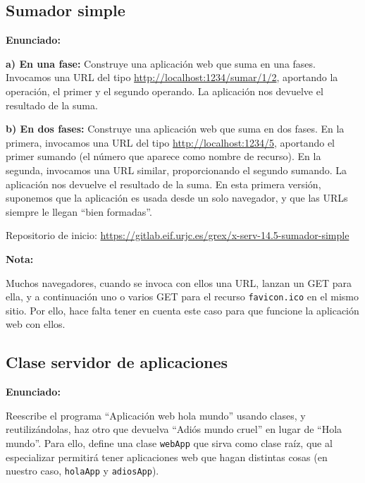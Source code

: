 \subsection{Sumador simple}
\label{subsec:sumador-simple}

\textbf{Enunciado:}

{\bf a) En una fase:} Construye una aplicación web que suma en una fases. Invocamos una URL del tipo \url{http://localhost:1234/sumar/1/2}, aportando la operación, el primer y el segundo operando. La aplicación nos devuelve el resultado de la suma.

{\bf b) En dos fases: } Construye una aplicación web que suma en dos fases. En la primera, invocamos una URL del tipo \url{http://localhost:1234/5}, aportando el primer sumando (el número que aparece como nombre de recurso). En la segunda, invocamos una URL similar, proporcionando el segundo sumando. La aplicación nos devuelve el resultado de la suma. En esta primera versión, suponemos que la aplicación es usada desde un solo navegador, y que las URLs siempre le llegan ``bien formadas''.

Repositorio de inicio: \url{https://gitlab.eif.urjc.es/grex/x-serv-14.5-sumador-simple}

\textbf{Nota:}

Muchos navegadores, cuando se invoca con ellos una URL, lanzan un GET para ella, y a continuación uno o varios GET para el recurso \texttt{favicon.ico} en el mismo sitio. Por ello, hace falta tener en cuenta este caso para que funcione la aplicación web con ellos.

\subsection{Clase servidor de aplicaciones}
\label{subsec:clase-serv-aplis}

\textbf{Enunciado:}

Reescribe el programa ``Aplicación web hola mundo'' usando clases, y reutilizándolas, haz otro que devuelva ``Adiós mundo cruel'' en lugar de ``Hola mundo''. Para ello, define una clase \texttt{webApp} que sirva como clase raíz, que al especializar permitirá tener aplicaciones web que hagan distintas cosas (en nuestro caso, \texttt{holaApp} y \texttt{adiosApp}).

